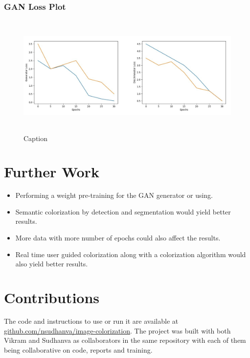 \documentclass{article}
\begin{document}
\subsubsection{GAN Loss Plot}

\begin{figure}[htbp!]
\begin{center}
    \includegraphics[width=13cm, height=6cm]{gan-loss-plot.png}
    \caption{Caption}
\end{center}
\end{figure}

\section{Further Work}

\begin{itemize}
    \item Performing a weight pre-training for the GAN generator or using.
    \item Semantic colorization by detection and segmentation would yield better results.
    \item More data with more number of epochs could also affect the results.
    \item Real time user guided colorization along with a colorization algorithm would also yield better results.
\end{itemize}

\section{Contributions}

The code and instructions to use or run it are available 
at \url{github.com/nsudhanva/image-colorization}. 
The project was built with both Vikram and Sudhanva as collaborators in the same repository with each of them being collaborative on code, reports and training.
\end{document}
